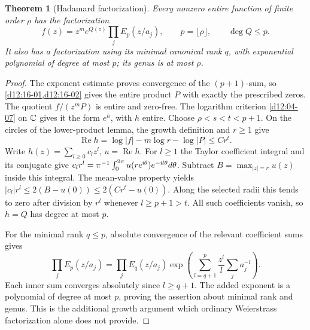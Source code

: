 \documentclass[11pt,a4paper,openany]{book}
\newtheorem{theorem}{Theorem}[chapter]
\theoremstyle{definition}
\theoremstyle{remark}\newtheorem{remark}[theorem]{Remark}
\DeclareMathOperator{\Ree}{Re}\DeclareMathOperator{\Imm}{Im}
\newcommand{\family}[1]{}
\begin{document}
\begin{theorem}[Hadamard factorization]\label{d12:17-05}\family{D12.17.05}
Every nonzero entire function of finite order $\rho$ has the factorization
\[
 f(z)=z^m e^{Q(z)}\prod_jE_p(z/a_j),\qquad
 p=\lfloor\rho\rfloor,\qquad\deg Q\le p.
\]
It also has a factorization using its minimal canonical rank $q$, with
exponential polynomial of degree at most $p$; its genus is at most $\rho$.
\end{theorem}
\begin{proof}
The exponent estimate proves convergence of the $(p+1)$-sum, so
\cref{d12:16-01,d12:16-02} gives the entire product $P$ with exactly
the prescribed zeros. The quotient $f/(z^mP)$ is entire and zero-free.
The logarithm criterion \cref{d12:04-07} on $\mathbb C$ gives it the form
$e^h$, with $h$ entire. Choose $\rho<s<t<p+1$. On the circles of
the lower-product lemma, the growth definition and $r\ge1$ give
\[
                  \Ree h=\log|f|-m\log r-\log|P|\le C r^t.
\]
Write $h(z)=\sum_{l\ge0}c_lz^l$, $u=\Ree h$. For $l\ge1$ the
Taylor coefficient integral and its conjugate give
$c_l r^l=\pi^{-1}\int_0^{2\pi}u(re^{\mathrm i\theta})e^{-\mathrm i l\theta}d\theta$.
Subtract $B=\max_{|z|=r}u(z)$ inside this integral. The mean-value
property yields
$|c_l|r^l\le2(B-u(0))\le2(Cr^t-u(0))$.
Along the selected radii this tends to zero after division by $r^l$
whenever $l\ge p+1>t$. All such coefficients vanish, so $h=Q$ has
degree at most $p$.

For the minimal rank $q\le p$, absolute convergence of the relevant
coefficient sums gives
\[
 \prod_jE_p(z/a_j)=\prod_jE_q(z/a_j)
 \exp\left(\sum_{l=q+1}^p\frac{z^l}{l}\sum_j a_j^{-l}\right).
\]
Each inner sum converges absolutely since $l\ge q+1$. The added
exponent is a polynomial of degree at most $p$, proving the assertion
about minimal rank and genus. This is the additional growth argument
which ordinary Weierstrass factorization alone does not provide.
\end{proof}
\end{document}
